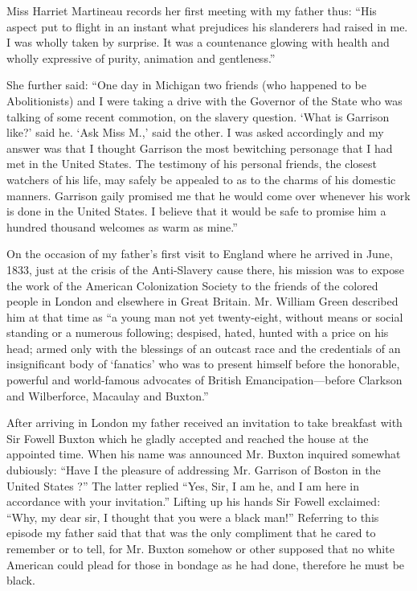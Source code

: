 \documentclass{book}
\begin{document}
Miss Harriet Martineau records her first meeting with my father thus: “His aspect put to flight in an instant what prejudices his slanderers had raised in me. I was wholly taken by surprise. It was a countenance glowing with health and wholly expressive of purity, animation and gentleness.”

She further said: “One day in Michigan two friends (who happened to be Abolitionists) and I were taking a drive with the Governor of the State who was talking of some recent commotion, on the slavery question. ‘What is Garrison like?’ said he. ‘Ask Miss M.,’ said the other. I was asked accordingly and my answer was that I thought Garrison the most bewitching personage that I had met in the United States. The testimony of his personal friends, the closest watchers of his life, may safely be appealed to as to the charms of his domestic manners. Garrison gaily promised me that he would come over whenever his work is done in the United States. I believe that it would be safe to promise him a hundred thousand welcomes as warm as mine.”

On the occasion of my father’s first visit to England where he arrived in June, 1833, just at the crisis of the Anti-Slavery cause there, his mission was to expose the work of the American Colonization Society to the friends of the colored people in London and elsewhere in Great Britain. Mr. William Green described him at that time as “a young man not yet twenty-eight, without means or social standing or a numerous following; despised, hated, hunted with a price on his head; armed only with the blessings of an outcast race and the credentials of an insignificant body of ‘fanatics’ who was to present himself before the honorable, powerful and world-famous advocates of British Emancipation—before Clarkson and Wilberforce, Macaulay and Buxton.”

After arriving in London my father received an invitation to take breakfast with Sir Fowell Buxton which he gladly accepted and reached the house at the appointed time. When his name was announced Mr. Buxton inquired somewhat dubiously: “Have I the pleasure of addressing Mr. Garrison of Boston in the United States ?” The latter replied “Yes, Sir, I am he, and I am here in accordance with your invitation.” Lifting up his hands Sir Fowell exclaimed: “Why, my dear sir, I thought that you were a black man!” Referring to this episode my father said that that was the only compliment that he cared to remember or to tell, for Mr. Buxton somehow or other supposed that no white American could plead for those in bondage as he had done, therefore he must be black.
\end{document}
